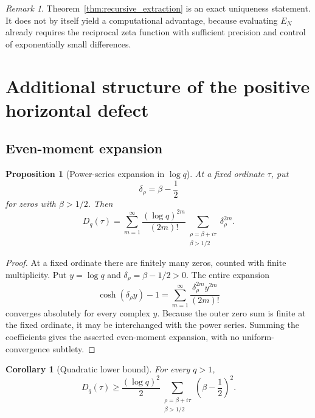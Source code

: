 \documentclass[11pt]{amsart}
\numberwithin{equation}{section}
\theoremstyle{plain}
\newtheorem{proposition}[theorem]{Proposition}
\newtheorem{corollary}[theorem]{Corollary}
\theoremstyle{definition}
\theoremstyle{remark}
\newtheorem{remark}[theorem]{Remark}
\newcommand{\1}{\mathbf{1}}
\begin{document}
\begin{remark}
\label{rem:recursive_not_algorithmic_gain}
Theorem~\ref{thm:recursive_extraction} is an exact uniqueness statement.
It does not by itself yield a computational advantage, because evaluating
$E_N$ already requires the reciprocal zeta function with sufficient
precision and control of exponentially small differences.
\end{remark}

\section{Additional structure of the positive horizontal defect}
\label{sec:additional_positive_defect}

\subsection{Even-moment expansion}
\label{subsec:even_moment_expansion}

\begin{proposition}[Power-series expansion in $\log q$]
\label{prop:Dq_power_series}
At a fixed ordinate $\tau$, put
\begin{equation}
\delta_\rho=\beta-\frac12
\label{eq:delta_rho_definition}
\end{equation}
for zeros with $\beta>1/2$.  Then
\begin{equation}
D_q(\tau)
=
\sum_{m=1}^{\infty}
\frac{(\log q)^{2m}}{(2m)!}
\sum_{\substack{\rho=\beta+i\tau\\\beta>1/2}}
\delta_\rho^{2m}.
\label{eq:Dq_even_moments}
\end{equation}
\end{proposition}

\begin{proof}
At a fixed ordinate there are finitely many zeros, counted with finite
multiplicity.  Put \(y=\log q\) and
\(\delta_\rho=\beta-1/2>0\).  The entire expansion
\begin{equation}
\cosh(\delta_\rho y)-1
=
\sum_{m=1}^{\infty}
\frac{\delta_\rho^{2m}y^{2m}}{(2m)!}
\label{eq:Dq_cosh_series_proof}
\end{equation}
converges absolutely for every complex \(y\).  Because the outer zero sum
is finite at the fixed ordinate, it may be interchanged with the power
series.  Summing the coefficients gives the asserted even-moment
expansion, with no uniform-convergence subtlety.
\end{proof}

\begin{corollary}[Quadratic lower bound]
\label{cor:Dq_quadratic_lower}
For every $q>1$,
\begin{equation}
D_q(\tau)
\geq
\frac{(\log q)^2}{2}
\sum_{\substack{\rho=\beta+i\tau\\\beta>1/2}}
\left(\beta-\frac12\right)^2.
\label{eq:Dq_quadratic_lower}
\end{equation}
\end{corollary}
\end{document}
